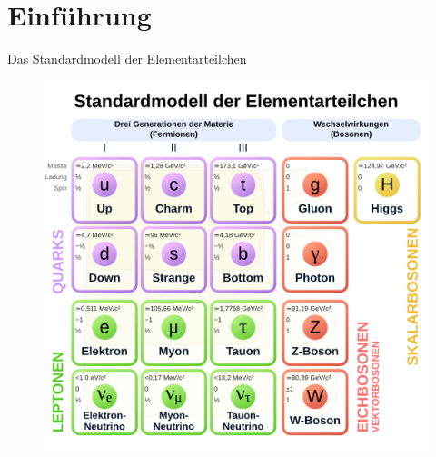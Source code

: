 \documentclass[aspectratio=169]{beamer} %
\begin{document}
    \section{Einführung}
    \begin{frame}{Das Standardmodell der Elementarteilchen}
      \begin{figure}
        \centering
        \begin{minipage}{0.6\textwidth}
          \centering
          \includegraphics[width=\textwidth, keepaspectratio, height=0.9\textheight]{502px-Standard_Model_of_Elementary_Particles-de.svg.png}
        \end{minipage}
        \hfill
        \begin{minipage}{0.38\textwidth}
          \scriptsize
        \end{minipage}
      \end{figure}
    \end{frame}
\end{document}
